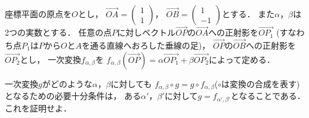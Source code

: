 \documentclass[../../main.tex]{subfiles}
\begin{document}
座標平面の原点を$O$とし，
$\overrightarrow{OA}=
\begin{pmatrix} 1 \\ 1
\end{pmatrix}$，
$\overrightarrow{OB}=
\begin{pmatrix} 1 \\ -1
\end{pmatrix}$とする．
また$\alpha$，$\beta$は2つの実数とする．
任意の点$P$に対しベクトル$\overrightarrow{OP}$の$\overrightarrow{OA}$への正射影を$\overrightarrow{OP_1}$
(すなわち点$P_1$は$P$から$O$と$A$を通る直線へおろした垂線の足)，
$\overrightarrow{OP}$の$\overrightarrow{OB}$への正射影を$\overrightarrow{OP_2}$とし，
一次変換$f_{\alpha,\beta}$を
$f_{\alpha,\beta}(\overrightarrow{OP})=\alpha\overrightarrow{OP_1}+\beta\overrightarrow{OP_2}$によって定める．

一次変換$g$がどのような$\alpha$，$\beta$に対しても
$f_{\alpha,\beta} \circ g = g \circ f_{\alpha,\beta}$($\circ$は変換の合成を表す)
となるための必要十分条件は，
ある$\alpha'$，$\beta'$に対して$g=f_{\alpha',\beta'}$となることである．
これを証明せよ．
\end{document}
